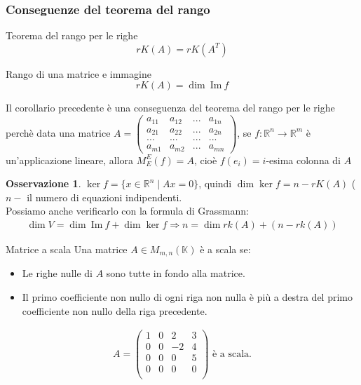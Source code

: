 \documentclass[a4paper]{article}
\newcommand{\IM}{\ \mathrm{Im} \ }
\theoremstyle{definition}
\newtheorem*{oss}{Osservazione}
\begin{document}
\subsubsection{Conseguenze del teorema del rango}
\begin{cor}{Teorema del rango per le righe}{}
	 \[rK(A) = rK(A^T)\]
\end{cor}


\begin{cor}{Rango di una matrice e immagine}{}
	\[rK(A) = \dim \IM f\]
\end{cor}
Il corollario precedente è una conseguenza del teorema del rango per le righe perchè
data una matrice $A = \begin{pmatrix}
		a_{11} & a_{12} & ... & a_{1n} \\
		a_{21} & a_{22} & ... & a_{2n} \\
		...    & ...    & ... & ...    \\
		a_{m1} & a_{m2} & ... & a_{mn}
	\end{pmatrix}$,
se $f:\mathbb{R}^n \rightarrow \mathbb{R}^m$ è un'applicazione lineare, allora $M_E^E(f) = A$, cioè $f(e_i) = i$-esima colonna di $A$

\begin{oss}
	$\ker f = \{x \in \mathbb{R}^n \mid Ax = 0\}$, quindi $\dim \ker f = n - rK(A)$ ($n -$ il numero di equazioni indipendenti. \\
	Possiamo anche verificarlo con la formula di Grassmann:
	\begin{align*}
		\dim V = \dim \IM f + \dim \ker f \Rightarrow n = \dim rk(A) + (n - rk(A))
	\end{align*}
\end{oss}

\begin{deff}{Matrice a scala}{}
	Una matrice $A \in M_{m,n}(\mathbb{K})$ è a scala se:
	\begin{itemize}
		\item Le righe nulle di $A$ sono tutte in fondo alla matrice.
		\item Il primo coefficiente non nullo di ogni riga non nulla è più a destra del primo coefficiente non nullo della riga precedente.
	\end{itemize}

	\begin{align*}
		A = \begin{pmatrix}
			1 & 0 & 2 & 3 \\
			0 & 0 & -2 & 4 \\
			0 & 0 & 0 & 5 \\
			0 & 0 & 0 & 0 \\
		\end{pmatrix} \text{ è a scala.}
	\end{align*}
\end{deff}
\end{document}
